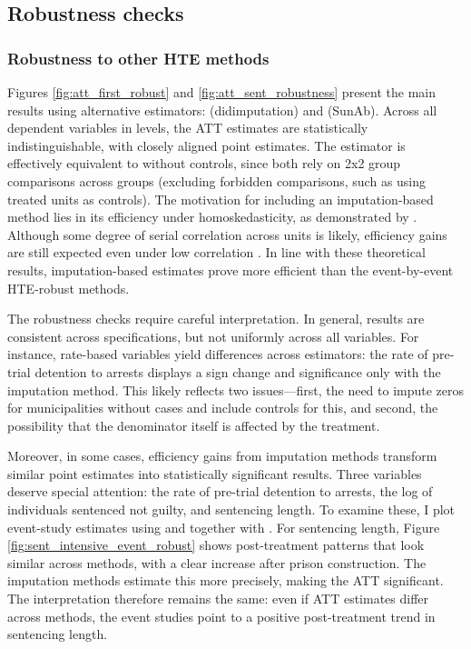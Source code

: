 

\subsection*{Robustness checks}

\subsubsection*{Robustness to other HTE methods}

Figures \ref{fig:att_first_robust} and \ref{fig:att_sent_robustness} present the main results using alternative estimators: \cite{Borusyak-DIDImp} (didimputation) and \cite{SunAb} (SunAb). Across all dependent variables in levels, the ATT estimates are statistically indistinguishable, with closely aligned point estimates. The \cite{SunAb} estimator is effectively equivalent to \cite{Callaway} without controls, since both rely on 2x2 group comparisons across groups (excluding forbidden comparisons, such as using treated units as controls). The motivation for including an imputation-based method lies in its efficiency under homoskedasticity, as demonstrated by \cite{Borusyak-DIDImp}. Although some degree of serial correlation across units is likely, efficiency gains are still expected even under low correlation \citep{Chaise-ReviewDID}. In line with these theoretical results, imputation-based estimates prove more efficient than the event-by-event HTE-robust methods.

The robustness checks require careful interpretation. In general, results are consistent across specifications, but not uniformly across all variables. For instance, rate-based variables yield differences across estimators: the rate of pre-trial detention to arrests displays a sign change and significance only with the imputation method. This likely reflects two issues—first, the need to impute zeros for municipalities without cases and include controls for this, and second, the possibility that the denominator itself is affected by the treatment. 

Moreover, in some cases, efficiency gains from imputation methods transform similar point estimates into statistically significant results. Three variables deserve special attention: the rate of pre-trial detention to arrests, the log of individuals sentenced not guilty, and sentencing length. To examine these, I plot event-study estimates using \cite{Gardner} and \cite{Liu-FECT} together with \cite{Borusyak-DIDImp}. For sentencing length, Figure \ref{fig:sent_intensive_event_robust} shows post-treatment patterns that look similar across methods, with a clear increase after prison construction. The imputation methods estimate this more precisely, making the ATT significant. The interpretation therefore remains the same: even if ATT estimates differ across methods, the event studies point to a positive post-treatment trend in sentencing length.

